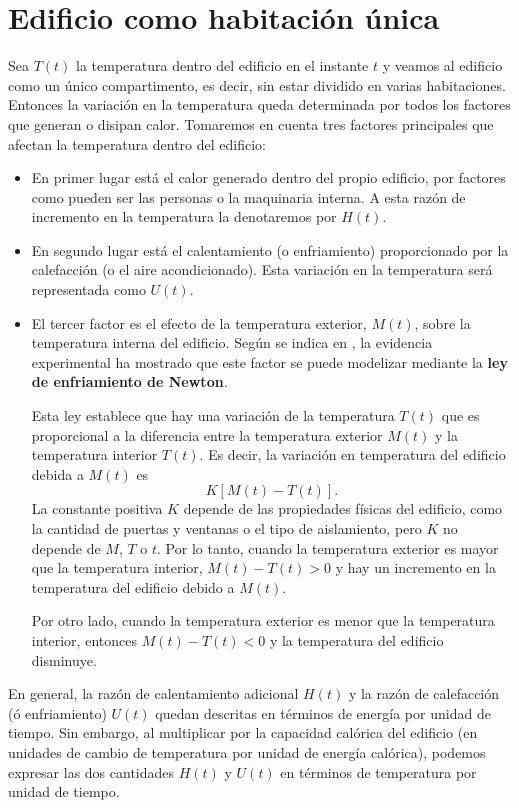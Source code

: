 \section{Edificio como habitación única}
Sea $T(t)$ la temperatura dentro del edificio en el instante $t$ y veamos al edificio como un único compartimento, es decir, sin estar dividido en varias habitaciones. Entonces la variación en la temperatura queda determinada por todos los factores que generan o disipan calor. Tomaremos en cuenta tres factores principales que afectan la temperatura dentro del edificio:
\begin{itemize}
	\item En primer lugar está el calor generado dentro del propio edificio, por factores como pueden ser las personas o la maquinaria interna. A esta razón de incremento en la temperatura la denotaremos por $H(t)$.
	\item En segundo lugar está el calentamiento (o enfriamiento) proporcionado por la calefacción (o el aire acondicionado). Esta variación en la temperatura será representada como $U(t)$.
	\item El tercer factor es el efecto de la temperatura exterior, $M(t)$, sobre la temperatura interna del edificio. Según se indica en \cite{Nagle}, la evidencia experimental ha mostrado que este factor se puede modelizar mediante la \textbf{ley de enfriamiento de Newton}.
	
	Esta ley establece que hay una variación de la temperatura $T(t)$ que es proporcional a la diferencia entre la temperatura exterior $M(t)$ y la temperatura interior $T(t)$. Es decir, la variación en temperatura del edificio debida a $M(t)$ es 
	\begin{equation}
		K[M(t) - T(t)].
	\end{equation}
	La constante positiva $K$ depende de las propiedades físicas del edificio, como la cantidad de puertas y ventanas o el tipo de aislamiento, pero $K$ no depende de $M$, $T$ o $t$. Por lo tanto, cuando la temperatura exterior es mayor que la temperatura interior, $M(t) - T(t) > 0$ y hay un incremento en la temperatura del edificio debido a $M(t)$. 
	
	Por otro lado, cuando la temperatura exterior es menor que la temperatura interior, entonces $M(t) - T(t) < 0$ y la temperatura del edificio disminuye.
\end{itemize}
En general, la razón de calentamiento adicional $H(t)$ y la razón de calefacción
(ó enfriamiento) $U(t)$ quedan descritas en términos de energía por unidad de tiempo. Sin embargo, al multiplicar por la
capacidad calórica del edificio (en unidades de cambio de temperatura por unidad de energía calórica), podemos expresar las dos cantidades $H(t)$ y $U(t)$ en términos de temperatura por unidad de tiempo.

